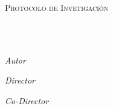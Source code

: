 \documentclass[
12pt, %
spanish, %
singlespacing, %
headsepline, %
]{MastersDoctoralThesis} %
\author{José Carlos \textsc{Gallegos-Mariscal}} %
\begin{document}
\frontmatter %

\pagestyle{plain} %


\begin{titlepage}
\begin{center}

{\scshape\LARGE \univname\par}\vspace{1cm} %
\textsc{Protocolo de Invetigación}\\[0.5cm] %

\HRule \\%
{\huge \bfseries \ttitle\par}\vspace{0.4cm} %
\HRule \\[0.5cm] %

\begin{minipage}[t]{0.6\textwidth}
\large \center
\emph{Autor}\\
\href{https://www.linkedin.com/in/jscarlos/}{\authorname} %
\vspace{0.5cm}
\end{minipage}
\begin{minipage}[t]{0.6\textwidth}
\large \center
\emph{Director} \\
\href{https://scholar.google.com.mx/citations?user=egt6SVMAAAAJ&hl=en}{\dirname} %
\vspace{0.2cm}
\end{minipage}
\begin{minipage}[t]{0.6\textwidth}
\large \center
\emph{Co-Director} \\
\href{https://google.com}{\codirname} %
\vspace{0.2cm}
\end{minipage}\\[1.5cm]


\end{center}
\end{titlepage}
\end{document}
